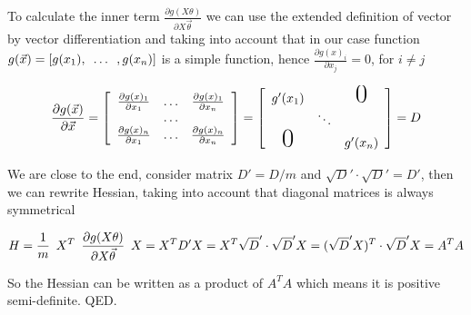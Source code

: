 \documentclass{article}
\begin{document}
To calculate the inner term $\frac{\partial  g(X\theta)}{\partial X \vec{\theta}}$ we can use the extended definition of vector by vector differentiation
 and taking into account that in our case function $g(\vec x) = [g(x_1), \enskip \dots \enskip , g(x_n)]$ is a simple function, hence $\frac{\partial g(x)_i}{\partial x_j} = 0$, for $i\not = j$

\[
\frac{\partial g(\vec x)}{\partial \vec x} = 
\left[
  \begin{array}{ccc}
	\frac{\partial g(x)_1}{\partial x_1} & \ldots & \frac{\partial g(x)_1}{\partial x_n}\\
	 & \ldots &  \\
	\frac{\partial g(x)_n}{\partial x_1} & \ldots  & \frac{\partial g(x)_n}{\partial x_n}
  \end{array}
\right] =
\left[
  \begin{array}{ccc}
	g'(x_1) &  & \text{\huge0} \\
	 & \ddots &  \\
	 \text{\huge0} &   & g'(x_n)
  \end{array}
\right] = D
\]

We are close to the end, consider matrix $D' = D/m$ and $\sqrt D' \cdot \sqrt D' = D'$, then we can rewrite Hessian, taking into account that diagonal matrices is always symmetrical

\[
H = \frac1m \enskip  X^T \enskip \frac{\partial  g(X\theta)}{\partial X \vec{\theta}} \enskip  X
=  X^T D'  X
= X^T \sqrt D' \cdot \sqrt D' X
= (\sqrt D' X)^T \cdot \sqrt D' X
= A^T A
\]

So the Hessian can be written as a product of $A^T A$ which means it is positive semi-definite. QED.
\end{document}
